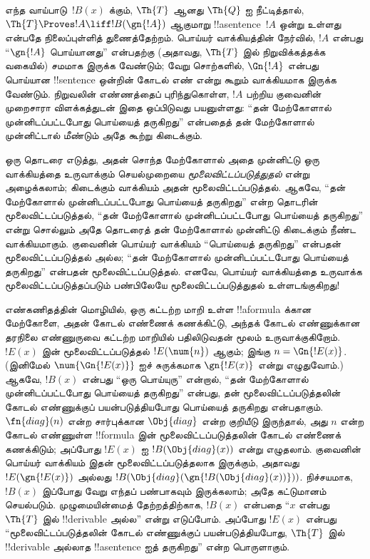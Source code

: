 \documentclass[../../../include/open-logic-section]{subfiles}
\begin{document}



\begin{explain}
எந்த வாய்பாடு~$!B(x)$ க்கும், $\Th{T}$ ஆனது
$\Th{Q}$ ஐ நீட்டித்தால், $\Th{T} \Proves !A \liff !B(\gn{!A})$
ஆகுமாறு !!a{sentence}~$!A$ ஒன்று உள்ளது என்பதே நிலைப்புள்ளித்
துணைத்தேற்றம். பொய்யர் வாக்கியத்தின் நேர்வில், $!A$ என்பது
“$\gn{!A}$ பொய்யானது” என்பதற்கு (அதாவது, $\Th{T}$ இல்
நிறுவிக்கத்தக்க வகையில்) சமமாக இருக்க வேண்டும்; வேறு சொற்களில்,
$\Gn{!A}$ என்பது பொய்யான !!{sentence} ஒன்றின் கோடல் எண் என்று
கூறும் வாக்கியமாக இருக்க வேண்டும். நிறுவலின் எண்ணத்தைப்
புரிந்துகொள்ள, $!A$ பற்றிய குவைனின் முறைசாரா விளக்கத்துடன் இதை
ஒப்பிடுவது பயனுள்ளது: “தன் மேற்கோளால் முன்னிடப்பட்டபோது பொய்யைத்
தருகிறது” என்பதைத் தன் மேற்கோளால் முன்னிட்டால் மீண்டும் அதே
கூற்று கிடைக்கும்.

ஒரு தொடரை எடுத்து, அதன் சொந்த மேற்கோளால் அதை முன்னிட்டு ஒரு
வாக்கியத்தை உருவாக்கும் செயல்முறையை \emph{மூலைவிட்டப்படுத்துதல்}
என்று அழைக்கலாம்; கிடைக்கும் வாக்கியம் அதன் மூலைவிட்டப்படுத்தல்.
ஆகவே, “தன் மேற்கோளால் முன்னிடப்பட்டபோது பொய்யைத் தருகிறது” என்ற
தொடரின் மூலைவிட்டப்படுத்தல், “தன் மேற்கோளால் முன்னிடப்பட்டபோது
பொய்யைத் தருகிறது” என்று சொல்லும் அதே தொடரைத் தன் மேற்கோளால்
முன்னிட்டு கிடைக்கும் நீண்ட வாக்கியமாகும். குவைனின் பொய்யர்
வாக்கியம் “பொய்யைத் தருகிறது” என்பதன் மூலைவிட்டப்படுத்தல் அல்ல;
“தன் மேற்கோளால் முன்னிடப்பட்டபோது பொய்யைத் தருகிறது” என்பதன்
மூலைவிட்டப்படுத்தல். எனவே, பொய்யர் வாக்கியத்தை உருவாக்க
மூலைவிட்டப்படுத்தப்படும் பண்பிலேயே மூலைவிட்டப்படுத்துதல்
உள்ளடங்குகிறது!{}

எண்கணிதத்தின் மொழியில், ஒரு கட்டற்ற மாறி உள்ள
!!a{formula} க்கான மேற்கோளை, அதன் கோடல் எண்ணைக் கணக்கிட்டு,
அந்தக் கோடல் எண்ணுக்கான தரநிலை எண்ணுருவை கட்டற்ற மாறியில்
பதிலிடுவதன் மூலம் உருவாக்குகிறோம். $!E(x)$ இன்
மூலைவிட்டப்படுத்தல் $!E(\num{n})$ ஆகும்; இங்கு
$n = \Gn{!E(x)}$. (இனிமேல் $\num{\Gn{!E(x)}}$ ஐச்
சுருக்கமாக $\gn{!E(x)}$ என்று எழுதுவோம்.) ஆகவே, $!B(x)$ என்பது
“ஒரு பொய்யுரு” என்றால், “தன் மேற்கோளால் முன்னிடப்பட்டபோது
பொய்யைத் தருகிறது” என்பது, தன் மூலைவிட்டப்படுத்தலின் கோடல்
எண்ணுக்குப் பயன்படுத்தியபோது பொய்யைத் தருகிறது என்பதாகும்.
$\fn{diag}(n)$ என்ற சார்புக்கான $\Obj{diag}$ என்ற குறியீடு
இருந்தால், அது $n$ என்ற கோடல் எண்ணுள்ள !!{formula} இன்
மூலைவிட்டப்படுத்தலின் கோடல் எண்ணைக் கணக்கிடும்; அப்போது
$!E(x)$ ஐ $!B(\Obj{diag}(x))$ என்று எழுதலாம். குவைனின்
பொய்யர் வாக்கியம் இதன் மூலைவிட்டப்படுத்தலாக இருக்கும், அதாவது
$!E(\gn{!E(x)})$ அல்லது
$!B(\Obj{diag}(\gn{!B(\Obj{diag}(x))}))$. நிச்சயமாக, $!B(x)$
இப்போது வேறு எந்தப் பண்பாகவும் இருக்கலாம்; அதே கட்டுமானம்
செயல்படும். முழுமையின்மைத் தேற்றத்திற்காக, $!B(x)$ என்பதை
“$x$ என்பது $\Th{T}$ இல் !!{derivable} அல்ல” என்று எடுப்போம்.
அப்போது $!E(x)$ என்பது “மூலைவிட்டப்படுத்தலின் கோடல் எண்ணுக்குப்
பயன்படுத்தியபோது, $\Th{T}$ இல் !!{derivable} அல்லாத
!!a{sentence} ஐத் தருகிறது” என்ற பொருளாகும்.


\end{explain}
\end{document}
